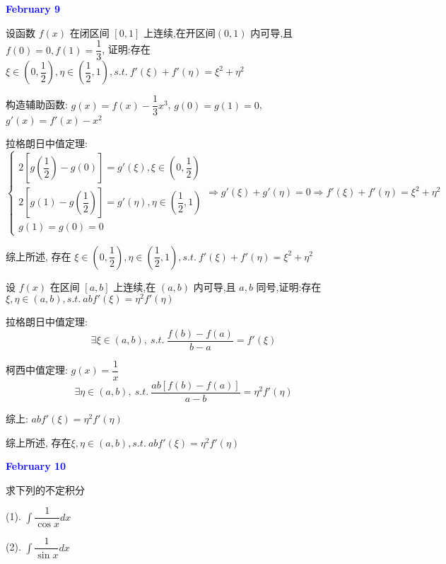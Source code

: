 \textcolor{blue}{\textbf{February 9}}

\begin{example}[][Exam: 28.2.3]
	设函数 $f(x)$ 在闭区间 $[0,1]$ 上连续,在开区间$(0,1)$ 内可导,且$f(0)=0,f(1)=\dfrac{1}{3}$,
	证明:存在 $\xi\in\left(0,\dfrac{1}{2}\right),\eta\in\left( \dfrac{1}{2},1\right),s.t.\ f'(\xi)+f'(\eta)=\xi^{2}+\eta^{2}$
\end{example}
\begin{solution}

	构造辅助函数: $g(x) = f(x) - \dfrac{1}{3}x^{3}$, $g(0) = g(1) = 0$, $g'(x) =f'(x) -x^{2}$

	拉格朗日中值定理:
	$$\begin{cases}
		2[g(\dfrac{1}{2})-g(0)] = g'(\xi), \xi\in(0,\dfrac{1}{2})\\
		2[g(1)-g(\dfrac{1}{2})] = g'(\eta), \eta\in(\dfrac{1}{2},1)\\
		g(1) = g(0) = 0
	\end{cases}\Rightarrow g'(\xi) + g'(\eta) = 0\Rightarrow f'(\xi) + f'(\eta) =\xi^{2} +\eta^{2}$$

	综上所述, 存在 $\xi\in\left(0,\dfrac{1}{2}\right),\eta\in\left( \dfrac{1}{2},1\right),s.t.\ f'(\xi)+f'(\eta)=\xi^{2}+\eta^{2}$
\end{solution}

\begin{example}[][Exam: 28.2.4]
	设 $f(x)$ 在区间 $[a,b]$ 上连续,在 $(a,b)$ 内可导,且 $a,b$ 同号,证明:存在$\xi,\eta\in(a,b),s.t.\ abf'(\xi)=\eta^{2}f'(\eta)$
\end{example}

\begin{solution}

	拉格朗日中值定理:
	$$\exists \xi\in (a,b),\ s.t.\ \dfrac{f(b)-f(a)}{b-a} = f'(\xi)$$

	柯西中值定理: $g(x) = \dfrac{1}{x}$
	$$\exists \eta\in(a,b),\ s.t.\ \dfrac{ab[f(b)-f(a)]}{a-b} = \eta^{2}f'(\eta)$$

	综上: $abf'(\xi) = \eta^{2}f'(\eta)$

	综上所述, 存在$\xi,\eta\in(a,b),s.t.\ abf'(\xi)=\eta^{2}f'(\eta)$
\end{solution}

\textcolor{blue}{\textbf{February 10}}

\begin{example}[][Exam: 28.2.5]
	求下列的不定积分

(1). $\int \dfrac{1}{\cos x}dx$

(2). $\int \dfrac{1}{\sin x}dx$
\end{example}


